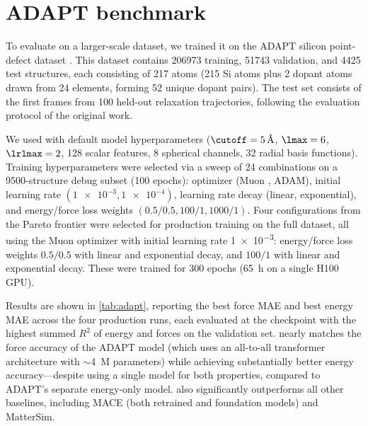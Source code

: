 \documentclass[10pt]{article}
\begin{document}
\clearpage
\section{ADAPT benchmark}
\label{sec:apx-adapt}

To evaluate \lorem on a larger-scale dataset, we trained it on the ADAPT silicon point-defect dataset \citep{dxzhrjk2025pre}. This dataset contains \num{206973} training, \num{51743} validation, and \num{4425} test structures, each consisting of \num{217} atoms (\num{215} Si atoms plus \num{2} dopant atoms drawn from \num{24} elements, forming \num{52} unique dopant pairs). The test set consists of the first frames from \num{100} held-out relaxation trajectories, following the evaluation protocol of the original work.

We used \lorem with default model hyperparameters ($\cutoff=\qty{5}{\angstrom}$, $\lmax=6$, $\lrlmax=2$, \num{128} scalar features, \num{8} spherical channels, \num{32} radial basis functions).
Training hyperparameters were selected via a sweep of \num{24} combinations on a \num{9500}-structure debug subset (\num{100} epochs): optimizer (Muon \cite{jordan2024muon}, ADAM), initial learning rate $(\num{1e-3}, \num{1e-4})$, learning rate decay (linear, exponential), and energy/force loss weights $(0.5/0.5, 100/1, 1000/1)$.
Four configurations from the Pareto frontier were selected for production training on the full dataset, all using the Muon optimizer with initial learning rate \num{1e-3}: energy/force loss weights $0.5/0.5$ with linear and exponential decay, and $100/1$ with linear and exponential decay.
These were trained for \num{300} epochs (\qty{65}{h} on a single H100 GPU).

Results are shown in \cref{tab:adapt}, reporting the best force MAE and best energy MAE across the four production runs, each evaluated at the checkpoint with the highest summed $R^2$ of energy and forces on the validation set.
\lorem nearly matches the force accuracy of the ADAPT model (which uses an all-to-all transformer architecture with $\sim$\qty{4}{M} parameters) while achieving substantially better energy accuracy---despite using a single model for both properties, compared to ADAPT's separate energy-only model. \lorem also significantly outperforms all other baselines, including MACE (both retrained and foundation models) and MatterSim.
\end{document}
